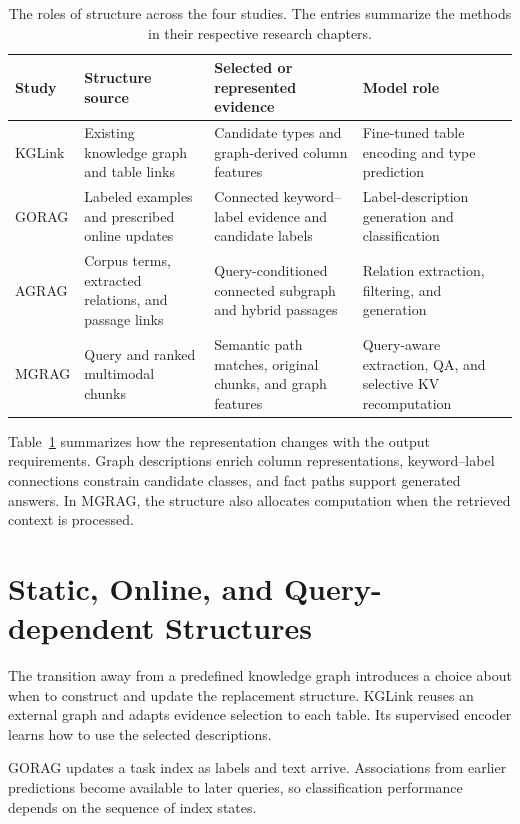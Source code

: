 \begin{table}[tbp]
\centering\small
\caption{The roles of structure across the four studies. The entries summarize the methods in their respective research chapters.}
\label{tab:discussion:roles}
\begin{tabular}{>{\raggedright\arraybackslash}p{}>{\raggedright\arraybackslash}p{}>{\raggedright\arraybackslash}p{}>{\raggedright\arraybackslash}p{}}
\toprule
Study & Structure source & Selected or represented evidence & Model role\\
\midrule
KGLink & Existing knowledge graph and table links & Candidate types and graph-derived column features & Fine-tuned table encoding and type prediction\\
GORAG & Labeled examples and prescribed online updates & Connected keyword--label evidence and candidate labels & Label-description generation and classification\\
AGRAG & Corpus terms, extracted relations, and passage links & Query-conditioned connected subgraph and hybrid passages & Relation extraction, filtering, and generation\\
MGRAG & Query and ranked multimodal chunks & Semantic path matches, original chunks, and graph features & Query-aware extraction, QA, and selective KV recomputation\\
\bottomrule
\end{tabular}
\end{table}

Table~\ref{tab:discussion:roles} summarizes how the representation changes with the output requirements. Graph descriptions enrich column representations, keyword--label connections constrain candidate classes, and fact paths support generated answers. In MGRAG, the structure also allocates computation when the retrieved context is processed.

\section{Static, Online, and Query-dependent Structures}
\label{sec:discussion:adaptation}
The transition away from a predefined knowledge graph introduces a choice about when to construct and update the replacement structure. KGLink reuses an external graph and adapts evidence selection to each table. Its supervised encoder learns how to use the selected descriptions.

GORAG updates a task index as labels and text arrive. Associations from earlier predictions become available to later queries, so classification performance depends on the sequence of index states.

